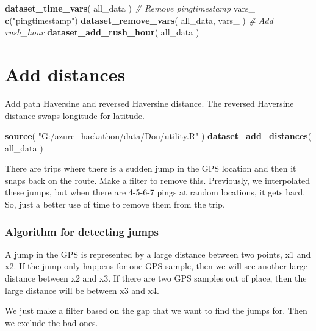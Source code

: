 \documentclass[]{article}
\newenvironment{Shaded}{\begin{snugshade}}{\end{snugshade}}
\newcommand{\CommentTok}[1]{\textcolor[rgb]{0.56,0.35,0.01}{\textit{#1}}}
\newcommand{\KeywordTok}[1]{\textcolor[rgb]{0.13,0.29,0.53}{\textbf{#1}}}
\newcommand{\NormalTok}[1]{#1}
\newcommand{\StringTok}[1]{\textcolor[rgb]{0.31,0.60,0.02}{#1}}
\begin{document}
\begin{Shaded}
\begin{Highlighting}[]
\KeywordTok{dataset_time_vars}\NormalTok{( all_data )}
\CommentTok{# Remove pingtimestamp}
\NormalTok{vars_ =}\StringTok{ }\KeywordTok{c}\NormalTok{(}\StringTok{"pingtimestamp"}\NormalTok{)}
\KeywordTok{dataset_remove_vars}\NormalTok{( all_data, vars_ )}
\CommentTok{# Add rush_hour}
\KeywordTok{dataset_add_rush_hour}\NormalTok{( all_data )}
\end{Highlighting}
\end{Shaded}

\hypertarget{add-distances}{%
\section{Add distances}\label{add-distances}}

Add path Haversine and reversed Haversine distance. The reversed
Haversine distance swaps longitude for latitude.

\begin{Shaded}
\begin{Highlighting}[]
\KeywordTok{source}\NormalTok{( }\StringTok{"G:/azure_hackathon/data/Don/utility.R"}\NormalTok{ )}
\KeywordTok{dataset_add_distances}\NormalTok{( all_data )}
\end{Highlighting}
\end{Shaded}

There are trips where there is a sudden jump in the GPS location and
then it snaps back on the route. Make a filter to remove this.
Previously, we interpolated these jumps, but when there are 4-5-6-7
pings at random locations, it gets hard. So, just a better use of time
to remove them from the trip.

\hypertarget{algorithm-for-detecting-jumps}{%
\subsubsection{Algorithm for detecting
jumps}\label{algorithm-for-detecting-jumps}}

A jump in the GPS is represented by a large distance between two points,
x1 and x2. If the jump only happens for one GPS sample, then we will see
another large distance between x2 and x3. If there are two GPS samples
out of place, then the large distance will be between x3 and x4.

We just make a filter based on the gap that we want to find the jumps
for. Then we exclude the bad ones.
\end{document}
